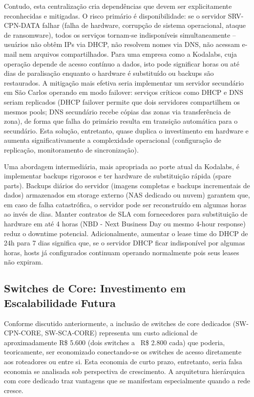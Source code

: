 \documentclass[12pt,a4paper]{article}
\begin{document}
Contudo, esta centralização cria dependências que devem ser explicitamente reconhecidas e mitigadas. O risco primário é disponibilidade: se o servidor SRV-CPN-DATA falhar (falha de hardware, corrupção de sistema operacional, ataque de ransomware), todos os serviços tornam-se indisponíveis simultaneamente -- usuários não obtêm IPs via DHCP, não resolvem nomes via DNS, não acessam e-mail nem arquivos compartilhados. Para uma empresa como a Kodalabs, cuja operação depende de acesso contínuo a dados, isto pode significar horas ou até dias de paralisação enquanto o hardware é substituído ou backups são restaurados. A mitigação mais efetiva seria implementar um servidor secundário em São Carlos operando em modo failover: serviços críticos como DHCP e DNS seriam replicados (DHCP failover permite que dois servidores compartilhem os mesmos pools; DNS secundário recebe cópias das zonas via transferência de zona), de forma que falha do primário resulta em transição automática para o secundário. Esta solução, entretanto, quase duplica o investimento em hardware e aumenta significativamente a complexidade operacional (configuração de replicação, monitoramento de sincronização).

Uma abordagem intermediária, mais apropriada ao porte atual da Kodalabs, é implementar backups rigorosos e ter hardware de substituição rápida (spare parts). Backups diários do servidor (imagens completas e backups incrementais de dados) armazenados em storage externo (NAS dedicado ou nuvem) garantem que, em caso de falha catastrófica, o servidor pode ser reconstruído em algumas horas ao invés de dias. Manter contratos de SLA com fornecedores para substituição de hardware em até 4 horas (NBD - Next Business Day ou mesmo 4-hour response) reduz o downtime potencial. Adicionalmente, aumentar o lease time do DHCP de 24h para 7 dias significa que, se o servidor DHCP ficar indisponível por algumas horas, hosts já configurados continuam operando normalmente pois seus leases não expiram.

\subsection{Switches de Core: Investimento em Escalabilidade Futura}

Conforme discutido anteriormente, a inclusão de switches de core dedicados (SW-CPN-CORE, SW-SCA-CORE) representa um custo adicional de aproximadamente R\$ 5.600 (dois switches a ~R\$ 2.800 cada) que poderia, teoricamente, ser economizado conectando-se os switches de acesso diretamente aos roteadores ou entre si. Esta economia de curto prazo, entretanto, seria falsa economia se analisada sob perspectiva de crescimento. A arquitetura hierárquica com core dedicado traz vantagens que se manifestam especialmente quando a rede cresce.
\end{document}
